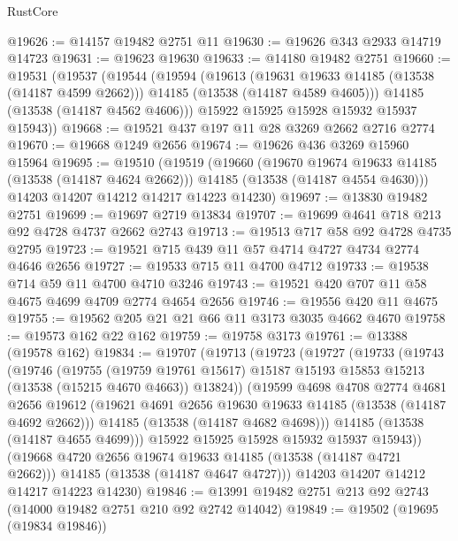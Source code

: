 \begin{lexlean}{RustCore}
\begin{coremodule}
@19626 := @14157 @19482 @2751 @11
@19630 := @19626 @343 @2933 @14719 @14723
@19631 := @19623 @19630
@19633 := @14180 @19482 @2751
@19660 := @19531
    (@19537
      (@19544
        (@19594
          (@19613
            (@19631 @19633 @14185 (@13538 (@14187 @4599 @2662)))
            @14185
            (@13538 (@14187 @4589 @4605)))
          @14185
          (@13538 (@14187 @4562 @4606)))
        @15922
        @15925
        @15928
        @15932
        @15937
        @15943))
@19668 := @19521 @437 @197 @11 @28 @3269 @2662 @2716 @2774
@19670 := @19668 @1249 @2656
@19674 := @19626 @436 @3269 @15960 @15964
@19695 := @19510
    (@19519
      (@19660
        (@19670 @19674 @19633 @14185 (@13538 (@14187 @4624 @2662)))
        @14185
        (@13538 (@14187 @4554 @4630)))
      @14203
      @14207
      @14212
      @14217
      @14223
      @14230)
@19697 := @13830 @19482 @2751
@19699 := @19697 @2719 @13834
@19707 := @19699 @4641 @718 @213 @92 @4728 @4737 @2662 @2743
@19713 := @19513 @717 @58 @92 @4728 @4735 @2795
@19723 := @19521 @715 @439 @11 @57 @4714 @4727 @4734 @2774 @4646 @2656
@19727 := @19533 @715 @11 @4700 @4712
@19733 := @19538 @714 @59 @11 @4700 @4710 @3246
@19743 := @19521 @420 @707 @11 @58 @4675 @4699 @4709 @2774 @4654 @2656
@19746 := @19556 @420 @11 @4675
@19755 := @19562 @205 @21 @21 @66 @11 @3173 @3035 @4662 @4670
@19758 := @19573 @162 @22 @162
@19759 := @19758 @3173
@19761 := @13388 (@19578 @162)
@19834 := @19707
    (@19713
      (@19723
        (@19727
          (@19733
            (@19743
              (@19746
                (@19755
                  (@19759 @19761 @15617)
                  @15187
                  @15193
                  @15853
                  @15213
                  (@13538 (@15215 @4670 @4663))
                  @13824))
              (@19599
                @4698
                @4708
                @2774
                @4681
                @2656
                @19612
                (@19621 @4691 @2656 @19630 @19633 @14185 (@13538 (@14187 @4692 @2662)))
                @14185
                (@13538 (@14187 @4682 @4698)))
              @14185
              (@13538 (@14187 @4655 @4699)))
            @15922
            @15925
            @15928
            @15932
            @15937
            @15943))
        (@19668 @4720 @2656 @19674 @19633 @14185 (@13538 (@14187 @4721 @2662)))
        @14185
        (@13538 (@14187 @4647 @4727)))
      @14203
      @14207
      @14212
      @14217
      @14223
      @14230)
@19846 := @13991 @19482 @2751 @213 @92 @2743 (@14000 @19482 @2751 @210 @92 @2742 @14042)
@19849 := @19502 (@19695 (@19834 @19846))

\end{coremodule}
\end{lexlean}
